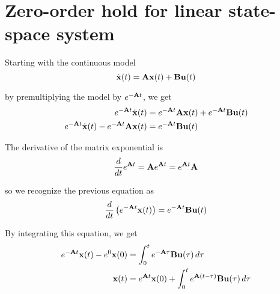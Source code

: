 \section{Zero-order hold for linear state-space system}
\label{sec:deriv_zoh_ss}

Starting with the continuous \gls{model}
\begin{equation*}
  \dot{\mathbf{x}}(t) = \mathbf{A}\mathbf{x}(t) + \mathbf{B}\mathbf{u}(t)
\end{equation*}

by premultiplying the \gls{model} by $e^{-\mathbf{A}t}$, we get
\begin{align*}
  e^{-\mathbf{A}t}\dot{\mathbf{x}}(t) &= e^{-\mathbf{A}t}\mathbf{A}\mathbf{x}(t) +
    e^{-\mathbf{A}t}\mathbf{B}\mathbf{u}(t) \\
  e^{-\mathbf{A}t}\dot{\mathbf{x}}(t) - e^{-\mathbf{A}t}\mathbf{A}\mathbf{x}(t) &=
    e^{-\mathbf{A}t}\mathbf{B}\mathbf{u}(t)
\end{align*}

The derivative of the matrix exponential is
\begin{equation*}
  \frac{d}{dt}e^{\mathbf{A}t} = \mathbf{A}e^{\mathbf{A}t} = e^{\mathbf{A}t}\mathbf{A}
\end{equation*}

so we recognize the previous equation as
\begin{equation*}
  \frac{d}{dt}\left(e^{-\mathbf{A}t}\mathbf{x}(t)\right) =
    e^{-\mathbf{A}t}\mathbf{B}\mathbf{u}(t)
\end{equation*}

By integrating this equation, we get
\begin{align*}
  e^{-\mathbf{A}t}\mathbf{x}(t) - e^0\mathbf{x}(0) &=
    \int_0^t e^{-\mathbf{A}\tau}\mathbf{B}\mathbf{u}(\tau) \,d\tau \\
  \mathbf{x}(t) &= e^{\mathbf{A}t}\mathbf{x}(0) +
    \int_0^t e^{\mathbf{A}(t - \tau)}\mathbf{B}\mathbf{u}(\tau) \,d\tau
\end{align*}

